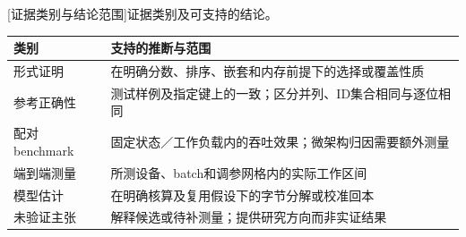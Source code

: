 \par\medskip\noindent\begin{minipage}{\linewidth}
\centering\captionsetup{hypcap=false}
[证据类别与结论范围]{证据类别及可支持的结论。}
\label{tab:3-evidence}
\footnotesize\setlength{\tabcolsep}{4pt}
\begin{tabularx}{\linewidth}{@{}p{.24\linewidth}X@{}}
\toprule
类别 & 支持的推断与范围 \\
\midrule
形式证明 & 在明确分数、排序、嵌套和内存前提下的选择或覆盖性质 \\
参考正确性 & 测试样例及指定键上的一致；区分并列、ID集合相同与逐位相同 \\
配对benchmark & 固定状态／工作负载内的吞吐效果；微架构归因需要额外测量 \\
端到端测量 & 所测设备、batch和调参网格内的实际工作区间 \\
模型估计 & 在明确核算及复用假设下的字节分解或校准回本 \\
未验证主张 & 解释候选或待补测量；提供研究方向而非实证结果 \\
\bottomrule
\end{tabularx}
\end{minipage}\par\medskip
